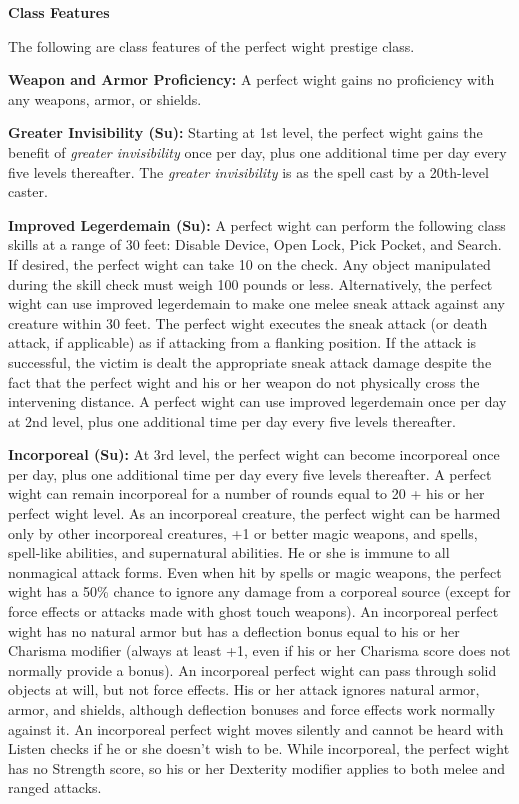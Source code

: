 \documentclass{article}
\begin{document}
\vspace{12pt}
\textbf{Class Features}

The following are class features of the perfect wight prestige class. 

\textbf{Weapon and Armor Proficiency:} A perfect wight gains no proficiency with 
any weapons, armor, or shields. 

\textbf{Greater Invisibility (Su):} Starting at 1st level, the perfect wight gains 
the benefit of \textit{greater invisibility }once per day, plus one additional 
time per day every five levels thereafter. The \textit{greater invisibility }is 
as the spell cast by a 20th-level caster. 

\textbf{Improved Legerdemain (Su):} A perfect wight can perform the following class 
skills at a range of 30 feet: Disable Device, Open Lock, Pick Pocket, and Search. 
If desired, the perfect wight can take 10 on the check. Any object manipulated 
during the skill check must weigh 100 pounds or less. Alternatively, the perfect 
wight can use improved legerdemain to make one melee sneak attack against any creature 
within 30 feet. The perfect wight executes the sneak attack (or death attack, if 
applicable) as if attacking from a flanking position. If the attack is successful, 
the victim is dealt the appropriate sneak attack damage despite the fact that the 
perfect wight and his or her weapon do not physically cross the intervening distance. 
A perfect wight can use improved legerdemain once per day at 2nd level, plus one 
additional time per day every five levels thereafter. 

\textbf{Incorporeal (Su):} At 3rd level, the perfect wight can become incorporeal 
once per day, plus one additional time per day every five levels thereafter. A 
perfect wight can remain incorporeal for a number of rounds equal to 20 + his or 
her perfect wight level. As an incorporeal creature, the perfect wight can be harmed 
only by other incorporeal creatures, +1 or better magic weapons, and spells, spell-like 
abilities, and supernatural abilities. He or she is immune to all nonmagical attack 
forms. Even when hit by spells or magic weapons, the perfect wight has a 50\% chance 
to ignore any damage from a corporeal source (except for force effects\textit{ 
}or attacks made with ghost touch weapons). An incorporeal perfect wight has no 
natural armor but has a deflection bonus equal to his or her Charisma modifier 
(always at least +1, even if his or her Charisma score does not normally provide 
a bonus). An incorporeal perfect wight can pass through solid objects at will, 
but not force effects. His or her attack ignores natural armor, armor, and shields, 
although deflection bonuses and force effects work normally against it. An incorporeal 
perfect wight moves silently and cannot be heard with Listen checks if he or she 
doesn't wish to be. While incorporeal, the perfect wight has no Strength score, 
so his or her Dexterity modifier applies to both melee and ranged attacks. 
\end{document}
